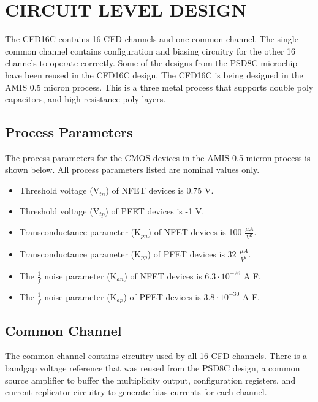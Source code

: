\documentclass[12pt,oneside,final]{siuethesis}
\theoremstyle{definition}
\begin{document}

\chapter{CIRCUIT LEVEL DESIGN}
\par The CFD16C contains 16 CFD channels and one common channel. The single common channel contains configuration and biasing circuitry for the other 16 channels to operate correctly. Some of the designs from the PSD8C microchip have been reused in the CFD16C design. The CFD16C is being designed in the AMIS 0.5 micron process. This is a three metal process that supports double poly capacitors, and high resistance poly layers. 
\section{Process Parameters}
\par The process parameters for the CMOS devices in the AMIS 0.5 micron process is shown below. All process parameters listed are nominal values only.

\begin{itemize}
\item
Threshold voltage (V$_{tn}$) of NFET devices is 0.75 V.
\item
Threshold voltage (V$_{tp}$) of PFET devices is -1 V.
\item
Transconductance parameter (K$_{pn}$) of NFET devices is 100 $\frac{\mu A}{V^{2}}$.
\item
Transconductance parameter (K$_{pp}$) of PFET devices is 32 $\frac{\mu A}{V^{2}}$.
\item
The $\frac{1}{f}$ noise parameter (K$_{an}$) of NFET devices is $6.3\cdot10^{-26}$ A F.
\item
The $\frac{1}{f}$ noise parameter (K$_{ap}$) of PFET devices is $3.8\cdot10^{-30}$ A F.
\end{itemize}

\section{Common Channel}
\par The common channel contains circuitry used by all 16 CFD channels. There is a bandgap voltage reference that was reused from the PSD8C design, a common source amplifier to buffer the multiplicity output, configuration registers, and current replicator circuitry to generate bias currents for each channel. 
\end{document}
